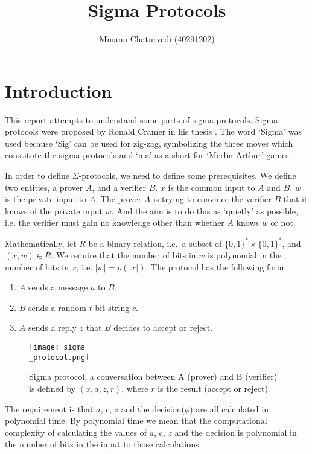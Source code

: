 \documentclass[12pt]{article}
\title{Sigma Protocols}
\author{Mmanu Chaturvedi (40291202)}
\begin{document}
	\maketitle
	\tableofcontents
	
	
	\section{Introduction}
	This report attempts to understand some parts of sigma protocols.  Sigma protocols were proposed by Ronald Cramer in his thesis \cite{cramer1996modular}. The word `Sigma' was used because `Sig' can be used for zig-zag, symbolizing the three moves which constitute the sigma protocols and `ma' as a short for `Merlin-Arthur' games \cite{babai1988arthur}.  
	
	In order to define $\Sigma$-protocols, we need to define some prerequisites.  We define two entities, a prover $A$, and a verifier $B$.  $x$ is the common input to $A$ and $B$. $w$ is the private input to $A$.  The prover $A$ is trying to convince the verifier $B$ that it knows of the private input $w$.  And the aim is to do this as `quietly' as possible, i.e. the verifier must gain no knowledge other than whether $A$ knows $w$ or not.

	Mathematically, let $R$ be a binary relation, i.e.\ a subset of $\{0, 1\}^* \times \{0, 1\}^*$, and $(x, w) \in R $. We require that the number of bits in $w$ is polynomial in the number of bits in $x$, i.e. $\left|w\right| = p(\left|x\right|)$.  The protocol has the following form:
	
	\begin{enumerate}
		\item $A$ sends a message $a$ to $B$.
		\item $B$ sends a random $t$-bit string $c$.
		\item $A$ sends a reply $z$ that $B$ decides to accept or reject.
	\end{enumerate}
	
	\begin{figure}
	\texttt{[image: sigma\\\_protocol.png]}
	\caption{Sigma protocol, a conversation between A (prover) and B (verifier) is defined by $(x, a, z, r)$, where $r$ is the result (accept or reject).}
	\end{figure}
	
	The requirement is that $a$, $c$, $z$ and the decision($\phi$) are all calculated in polynomial time.  By polynomial time we mean that the computational complexity of calculating the values of $a$, $c$, $z$ and the decision is polynomial in the number of bits in the input to those calculations.
	
\end{document}
